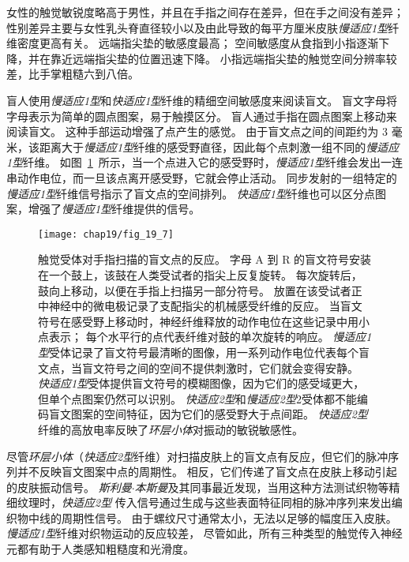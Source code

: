 女性的触觉敏锐度略高于男性，并且在手指之间存在差异，但在手之间没有差异；
性别差异主要与女性乳头脊直径较小以及由此导致的每平方厘米皮肤\textit{慢适应1型}纤维密度更高有关。
远端指尖垫的敏感度最高；
空间敏感度从食指到小指逐渐下降，并在靠近远端指尖垫的位置迅速下降。
小指远端指尖垫的触觉空间分辨率较差，比手掌粗糙六到八倍。


盲人使用\textit{慢适应1型}和\textit{快适应1型}纤维的精细空间敏感度来阅读盲文。
盲文字母将字母表示为简单的圆点图案，易于触摸区分。
盲人通过手指在圆点图案上移动来阅读盲文。
这种手部运动增强了点产生的感觉。
由于盲文点之间的间距约为 3 毫米，该距离大于\textit{慢适应1型}纤维的感受野直径，因此每个点刺激一组不同的\textit{慢适应1型}纤维。
如图~\ref{fig:19_7}~所示，当一个点进入它的感受野时，\textit{慢适应1型}纤维会发出一连串动作电位，而一旦该点离开感受野，它就会停止活动。
同步发射的一组特定的\textit{慢适应1型}纤维信号指示了盲文点的空间排列。
\textit{快适应1型}纤维也可以区分点图案，增强了\textit{慢适应1型}纤维提供的信号。


\begin{figure}[htbp]
	\centering
	\texttt{[image: chap19/fig\_19\_7]}
	\caption{触觉受体对手指扫描的盲文点的反应。
		字母 A 到 R 的盲文符号安装在一个鼓上，该鼓在人类受试者的指尖上反复旋转。
		每次旋转后，鼓向上移动，以便在手指上扫描另一部分符号。
		放置在该受试者正中神经中的微电极记录了支配指尖的机械感受纤维的反应。
		当盲文符号在感受野上移动时，神经纤维释放的动作电位在这些记录中用小点表示； 每个水平行的点代表纤维对鼓的单次旋转的响应。
		\textit{慢适应1型}受体记录了盲文符号最清晰的图像，用一系列动作电位代表每个盲文点，当盲文符号之间的空间不提供刺激时，它们就会变得安静。
		\textit{快适应1型}受体提供盲文符号的模糊图像，因为它们的感受域更大，但单个点图案仍然可以识别。 
		\textit{快适应2型}和\textit{慢适应2型}2受体都不能编码盲文图案的空间特征，因为它们的感受野大于点间距。
		\textit{快适应2型}纤维的高放电率反映了\textit{环层小体}对振动的敏锐敏感性\cite{phillips1990representation}。}
	\label{fig:19_7}
\end{figure}


尽管\textit{环层小体}（\textit{快适应2型}纤维）对扫描皮肤上的盲文点有反应，但它们的脉冲序列并不反映盲文图案中点的周期性。
相反，它们传递了盲文点在皮肤上移动引起的皮肤振动信号。
\textit{斯利曼$\cdot$本斯曼}及其同事最近发现，当用这种方法测试织物等精细纹理时，\textit{快适应2型} 传入信号通过生成与这些表面特征同相的脉冲序列来发出编织物中线的周期性信号。
由于螺纹尺寸通常太小，无法以足够的幅度压入皮肤。\textit{慢适应1型}纤维对织物运动的反应较差，
尽管如此，所有三种类型的触觉传入神经元都有助于人类感知粗糙度和光滑度。


